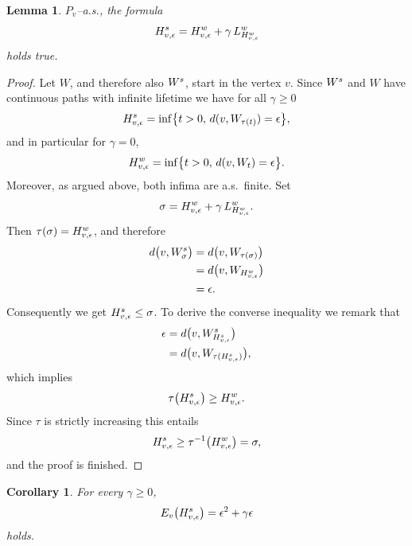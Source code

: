 \documentclass[11pt,a4paper]{amsart}
\newcommand{\gep}{\epsilon}
\renewcommand{\gg}{\gamma}
\newcommand{\gs}{\sigma}
\newcommand{\1}{1}
\newtheorem{lemma}[theorem]{Lemma}
\newtheorem{corollary}[theorem]{Corollary}
\theoremstyle{remark}
\newcommand{\TW}{\ensuremath H^w}
\newcommand{\Ws}{\ensuremath W^s}
\newcommand{\TsW}{\ensuremath H^s}
\numberwithin{equation}{section}
\begin{document}
\begin{lemma}   \label{lem4.3}
$P_v$--a.s., the formula
\begin{equation}    \label{eq4.5}
    \TsW_{v,\gep} = \TW_{v,\gep} + \gg\,L^w_{\TW_{v,\gep}}
\end{equation}
holds true.
\end{lemma}

\begin{proof}
Let $W$, and therefore also $\Ws$, start in the vertex $v$. Since $\Ws$ and $W$
have continuous paths with infinite lifetime we have for all $\gg\ge 0$
\begin{equation*}
    \TsW_{v,\gep} = \inf\bigl\{t>0,\, d(v,W_{\tau(t)})=\gep\bigr\},
\end{equation*}
and in particular for $\gg=0$,
\begin{equation*}
    \TW_{v,\gep} = \inf\bigl\{t>0,\, d(v,W_t)=\gep\bigr\}.
\end{equation*}
Moreover, as argued above, both infima are a.s.\ finite. Set
\begin{equation*}
    \gs = \TW_{v,\gep} + \gg\,L^w_{\TW_{v,\gep}}.
\end{equation*}
Then $\tau(\gs) = \TW_{v,\gep}$, and therefore
\begin{align*}
    d\bigl(v, \Ws_\gs\bigr)
        &= d\bigl(v, W_{\tau(\gs)}\bigr)\\
        &= d\bigl(v, W_{\TW_{v,\gep}}\bigr)\\
        &= \gep.
\end{align*}
Consequently we get $\TsW_{v,\gep} \le \gs$. To derive the converse inequality
we remark that
\begin{align*}
    \gep
        &= d\bigl(v, \Ws_{\TsW_{v,\gep}}\bigr)\\
        &= d\bigl(v, W_{\tau(\TsW_{v,\gep})}\bigr),
\end{align*}
which implies
\begin{equation*}
    \tau\bigl(\TsW_{v,\gep}\bigr)\ge \TW_{v,\gep}.
\end{equation*}
Since $\tau$ is strictly increasing this entails
\begin{equation*}
    \TsW_{v,\gep} \ge \tau^{-1}\bigl(\TW_{v,\gep}\bigr) = \gs,
\end{equation*}
and the proof is finished.
\end{proof}

\begin{corollary}   \label{cor4.4}
For every $\gg\ge 0$,
\begin{equation}    \label{eq4.6}
    E_v\bigl(\TsW_{v,\gep}\bigr)=\gep^2+\gg\gep
\end{equation}
holds.
\end{corollary}
\end{document}
